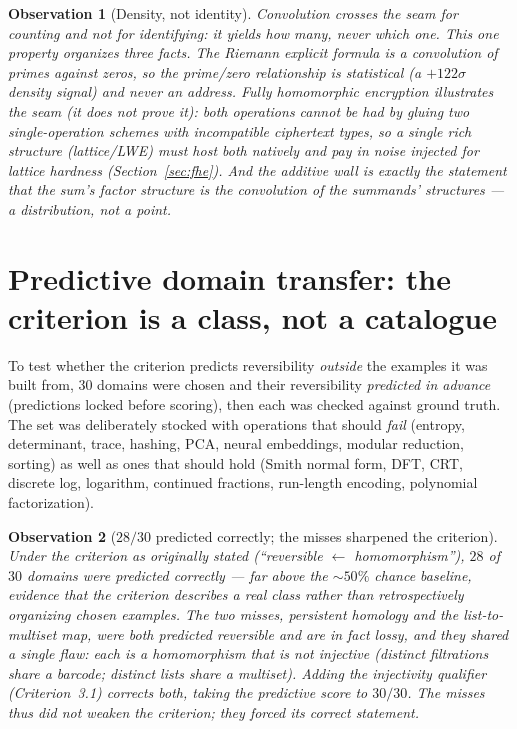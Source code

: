 \documentclass[11pt]{article}
\newtheorem{observation}{Observation}[section]
\begin{document}
\begin{observation}[Density, not identity]
Convolution crosses the seam for counting and not for identifying: it yields how many, never which one. This
one property organizes three facts. The Riemann explicit formula is a convolution of primes against zeros,
so the prime/zero relationship is statistical (a $+122\sigma$ density signal) and never an address. Fully
homomorphic encryption \emph{illustrates} the seam (it does not prove it): both operations cannot be had by
gluing two single-operation schemes with incompatible ciphertext types, so a single rich structure
(lattice/LWE) must host both natively and pay in noise injected for lattice hardness (Section~\ref{sec:fhe}). And the additive wall is exactly the statement that the
sum's factor structure is the convolution of the summands' structures --- a distribution, not a point.
\end{observation}

\section{Predictive domain transfer: the criterion is a class, not a catalogue}\label{sec:predictive}

To test whether the criterion predicts reversibility \emph{outside} the examples it was built from, $30$
domains were chosen and their reversibility \emph{predicted in advance} (predictions locked before scoring),
then each was checked against ground truth. The set was deliberately stocked with operations that should
\emph{fail} (entropy, determinant, trace, hashing, PCA, neural embeddings, modular reduction, sorting) as
well as ones that should hold (Smith normal form, DFT, CRT, discrete log, logarithm, continued fractions,
run-length encoding, polynomial factorization).

\begin{observation}[$28/30$ predicted correctly; the misses sharpened the criterion]
Under the criterion as originally stated (``reversible $\leftarrow$ homomorphism''), $28$ of $30$ domains
were predicted correctly --- far above the $\sim\!50\%$ chance baseline, evidence that the criterion
describes a real class rather than retrospectively organizing chosen examples. The two misses, persistent
homology and the list-to-multiset map, were both predicted reversible and are in fact lossy, and they shared
a single flaw: each is a homomorphism that is \emph{not injective} (distinct filtrations share a barcode;
distinct lists share a multiset). Adding the injectivity qualifier (Criterion~3.1) corrects both, taking the
predictive score to $30/30$. The misses thus did not weaken the criterion; they forced its correct
statement.
\end{observation}
\end{document}
